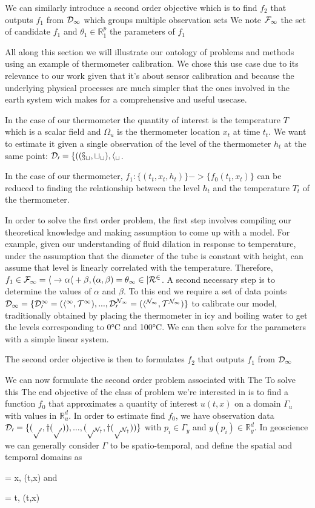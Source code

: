 \begin{bibunit}
{{  We can similarly introduce a second order objective which is to find $f_2$ that outputs $f_1$ from  $\cal{D}_1$ which groups multiple observation sets 
  We note $\cal{F}_1$  the set of candidate $f_1$ and $\theta_1 \in \mathbb{R}^p_1$ the parameters of $f_1$

All along this section we will illustrate our ontology of problems and methods using an example of thermometer calibration. We chose this use case due to its relevance to our work given that it's about sensor calibration and because the underlying physical processes are much simpler that the ones involved in the earth system wich makes for a comprehensive and useful usecase.

In the case of our thermometer the quantity of interest is the temperature  $T$ which is a scalar field and $\Omega_u$ is the thermometer location  $x_t$ at time $t_t$. 
  We want to estimate it given a single observation of the level of the thermometer $h_t$ at the same point: $\cal{D}_0 = \{((x_t, t_t), h_t$.

  In the case of our thermometer, $f_1: \{(t_t, x_t, h_t)\} -> \{f_0(t_t, x_t)\}$ can be reduced  to finding the relationship between the level $h_t$ and the temperature $T_t$ of the thermometer.


  In order to solve the first order problem, the first step involves compiling our theoretical knowledge and making assumption to come up with a model. For example, given our understanding of fluid dilation in response to temperature, under the assumption that the diameter of the tube is constant with height, can assume that level is linearly correlated with the temperature. Therefore, $f_1 \in \cal{F}_1 = { h \to \alpha h + \beta , (\alpha, \beta)=\theta_1 \in |R^2 }$.
    A second necessary step is to determine the values of $\alpha$ and $\beta$. To this end we require a set of data points $\cal{D}_1 = \{\cal{D}_0^1=(h^1, T^1), ..., \cal{D}_0^{N_1}=(h^{N_1}, T^{N_1})\}$ to calibrate our model, traditionally obtained by placing the thermometer in icy and boiling water to get the levels corresponding to 0°C and 100°C. We can then solve for the parameters with a simple linear system.




  The second order objective is then to formulates $f_2$ that outputs $f_1$ from  $\cal{D}_1$


  We can now formulate the second order problem associated with 
  The 
   To solve this 
  The end objective of the class of problem we're interested in is to find a function $f_0$  that approximates a quantity of interest $u(t, x)$ on a domain $\Gamma_u$ with values in $\mathbb{R}^d_u$.
  In order to estimate find $f_0$, we have observation data $\cal{D}_0 = \{(p_0, y(p_0)), ..., (p_{N_y}, y(p_{N_y})) \}$ with  $p_i \in \Gamma_y$ and $y(p_i) \in \mathbb{R}^d_y$.
  In geoscience we can generally consider $\Gamma$ to be spatio-temporal, and define the spatial and temporal domains  as {\Omega = {x, (t,x) \in \Gamma} and {\Tau = {t, (t,x) \in \Gamma}
  

}}}}
\end{bibunit}
